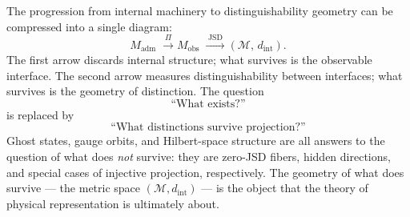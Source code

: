 \documentclass[12pt,a4paper]{article}
\theoremstyle{remark}
\begin{document}
The progression from internal machinery to distinguishability geometry
can be compressed into a single diagram:
\begin{equation}
  M_{\mathrm{adm}}
  \;\xrightarrow{\;\Pi\;}
  M_{\mathrm{obs}}
  \;\xrightarrow{\;\operatorname{JSD}\;}
  (\mathcal{M},\, d_{\mathrm{int}}).
\end{equation}
The first arrow discards internal structure; what survives is the observable
interface. The second arrow measures distinguishability between interfaces;
what survives is the geometry of distinction. The question
\begin{equation}
  \text{``What exists?''}
\end{equation}
is replaced by
\begin{equation}
  \text{``What distinctions survive projection?''}
\end{equation}
Ghost states, gauge orbits, and Hilbert-space structure are all answers to
the question of what does \emph{not} survive: they are zero-JSD fibers,
hidden directions, and special cases of injective projection, respectively.
The geometry of what does survive --- the metric space
$(\mathcal{M}, d_{\mathrm{int}})$ --- is the object that the theory of
physical representation is ultimately about.
\end{document}
